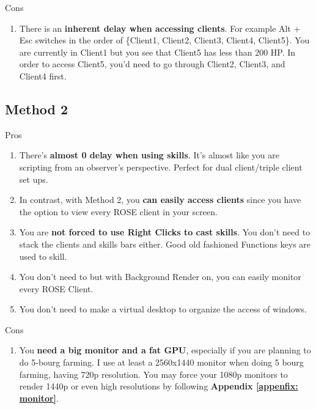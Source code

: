 \documentclass{article}
\begin{document}
   \item Cons
   \begin{enumerate}
     \item There is an \textbf{inherent delay when accessing clients}. For example Alt + Esc switches in the order of \{Client1, Client2, Client3, Client4, Client5\}. You are currently in Client1 but you see that Client5 has less than 200 HP. In order to access Client5, you'd need to go through Client2, Client3, and Client4 first. 
     
   \end{enumerate}

\subsection{Method 2}

   \item Pros
   \begin{enumerate}
     \item There's \textbf{almost 0 delay when using skills}. It's almost like you are scripting from an observer's perspective. Perfect for dual client/triple client set ups. 
   
     \item In contrast, with Method 2, you \textbf{can easily access clients} since you have the option to view every ROSE client in your screen. 
     
     \item You are \textbf{not forced to use Right Clicks to cast skills}. You don't need to stack the clients and skills bars either. Good old fashioned Functions keys are used to skill.
     
     \item You don't need to but with Background Render on, you can easily monitor every ROSE Client.
     
     \item You don't need to make a virtual desktop to organize the access of windows.
   \end{enumerate}
   
     
   
   \item Cons
   \begin{enumerate}
     \item You \textbf{need a big monitor and a fat GPU}, especially if you are planning to do 5-bourg farming. I use at least a 2560x1440 monitor when doing 5 bourg farming, having 720p resolution. You may force your 1080p monitors to render 1440p or even high resolutions by following \textbf{Appendix \ref{appenfix: monitor}}.
     
   \end{enumerate}
\end{document}
